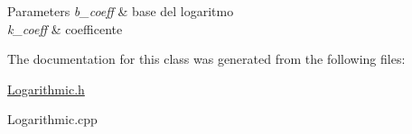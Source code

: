\begin{DoxyParams}{\-Parameters}
{\em b\-\_\-coeff} & base del logaritmo \\
\hline
{\em k\-\_\-coeff} & coefficente \\
\hline
\end{DoxyParams}


\-The documentation for this class was generated from the following files\-:\begin{DoxyCompactItemize}
\item 
\hyperlink{_logarithmic_8h}{\-Logarithmic.\-h}\item 
\-Logarithmic.\-cpp\end{DoxyCompactItemize}
